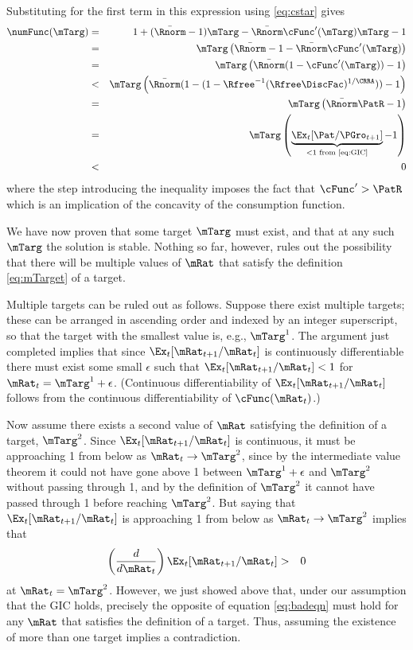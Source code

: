 \documentclass[titlepage]{\econtex}\providecommand{\texname}{BufferStockTheory}
\begin{document}
{Substituting for the first term in this expression using
\eqref{eq:cstar} gives
\begin{eqnarray*}
\numFunc(\mTarg) & = & 1+(\bar{\Rnorm}-1)\mTarg- \bar{\Rnorm}\cFunc^{\prime}(\mTarg)\mTarg - 1 \\
& = & \mTarg\left(\bar{\Rnorm}-1-\bar{\Rnorm}\cFunc^{\prime}(\mTarg)\right) \\
& = & \mTarg\left(\bar{\Rnorm}(1-\cFunc^{\prime}(\mTarg))-1\right) \\
& < & \mTarg\left(\bar{\Rnorm}(1-(1-{\Rfree}^{-1}(\Rfree\DiscFac)^{1/%
\CRRA}))-1\right) \\
& = & \mTarg\left(\bar{\Rnorm}\PatR-1%
\right) \\
& = & \mTarg\left(\underbrace{\Ex_{t}[{\Pat}/{\PGro}_{t+1}]}_{<
1\text{~from \eqref{eq:GIC}}}-1\right) \\
& < & 0
\end{eqnarray*}
where the step introducing the inequality imposes the fact that $\cFunc^{\prime} > \PatR$ which is an
implication of the concavity of the consumption function.

We have now proven that some target $\mTarg$ must exist, and that at any such
$\mTarg$ the solution is stable. Nothing so far, however, rules
out the possibility that there will be multiple values of $\mRat$ that
satisfy the definition \eqref{eq:mTarget} of a target.

Multiple targets can be ruled out as follows. Suppose there exist
multiple targets; these can be arranged in ascending order and indexed
by an integer superscript, so that the target with the smallest value is,
e.g., $\mTarg^{1}$. The argument just completed implies that since
$\Ex_{t}[{\mRat}_{t+1}/\mRat_{t}]$ is continuously differentiable
there must exist some small $\epsilon$ such that
$\Ex_{t}[{\mRat}_{t+1}/\mRat_{t}] < 1$ for $\mRat_{t} =
\mTarg^{1}+\epsilon$. (Continuous differentiability of
$\Ex_{t}[{\mRat}_{t+1}/\mRat_{t}]$ follows from the continuous
differentiability of $\cFunc(\mRat_{t})$.) 

Now assume there exists a second value of $\mRat$ satisfying the
definition of a target, $\mTarg^{2}$. Since
$\Ex_{t}[{\mRat}_{t+1}/\mRat_{t}]$ is continuous, it must be
approaching 1 from below as $\mRat_{t} \rightarrow \mTarg^{2}$, since
by the intermediate value theorem it could not have gone above 1
between $\mTarg^{1}+\epsilon$ and $\mTarg^{2}$ without passing through
1, and by the definition of $\mTarg^{2}$ it cannot have passed through
1 before reaching $\mTarg^{2}$.  But saying that
$\Ex_{t}[{\mRat}_{t+1}/\mRat_{t}]$ is approaching 1 from below as
$\mRat_{t} \rightarrow \mTarg^{2}$ implies that
\begin{eqnarray}
\left(\frac{d}{d\mRat_{t}}\right)\Ex_{t}[{\mRat}_{t+1}/\mRat_{t}] & > & 0
\label{eq:badeqn}
\end{eqnarray}
at $\mRat_{t}=\mTarg^{2}$. However, we just showed above that, under
our assumption that the GIC holds, precisely the opposite of equation
\eqref{eq:badeqn} must hold for any $\mRat$ that satisfies the definition
of a target. Thus, assuming the existence of more than one target
implies a contradiction.

}
\end{document}
